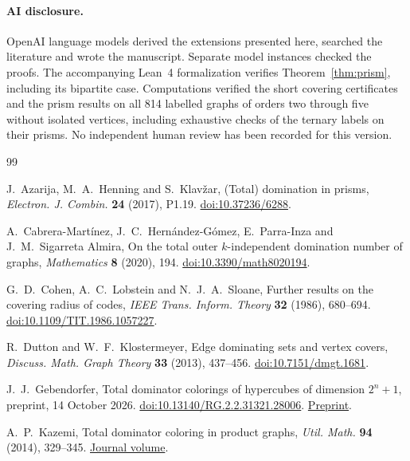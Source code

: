 \documentclass[11pt,a4paper]{article}
\begin{document}
\paragraph{AI disclosure.}
OpenAI language models derived the extensions presented here, searched the
literature and wrote the manuscript. Separate model instances checked
the proofs. The accompanying Lean~4 formalization verifies
Theorem~\ref{thm:prism}, including its bipartite case.
Computations verified the short covering certificates and
the prism results on all 814 labelled graphs of orders two through five
without isolated vertices, including exhaustive checks of the ternary
labels on their prisms. No independent human review has been recorded
for this version.

\begin{thebibliography}{99}
\raggedright

J.~Azarija, M.~A.~Henning and S.~Klav\v{z}ar,
(Total) domination in prisms,
\emph{Electron. J. Combin.} \textbf{24} (2017), P1.19.
\href{https://doi.org/10.37236/6288}{doi:10.37236/6288}.

A.~Cabrera-Mart\'inez, J.~C.~Hern\'andez-G\'omez, E.~Parra-Inza and
J.~M.~Sigarreta Almira, On the total outer $k$-independent domination
number of graphs, \emph{Mathematics} \textbf{8} (2020), 194.
\href{https://doi.org/10.3390/math8020194}{doi:10.3390/math8020194}.

G.~D.~Cohen, A.~C.~Lobstein and N.~J.~A.~Sloane,
Further results on the covering radius of codes,
\emph{IEEE Trans. Inform. Theory} \textbf{32} (1986), 680--694.
\href{https://doi.org/10.1109/TIT.1986.1057227}{doi:10.1109/TIT.1986.1057227}.

R.~Dutton and W.~F.~Klostermeyer, Edge dominating sets and vertex covers,
\emph{Discuss. Math. Graph Theory} \textbf{33} (2013), 437--456.
\href{https://doi.org/10.7151/dmgt.1681}{doi:10.7151/dmgt.1681}.

J.~J.~Gebendorfer, Total dominator colorings of hypercubes of dimension
$2^n+1$, preprint, 14 October 2026.
\href{https://doi.org/10.13140/RG.2.2.31321.28006}{doi:10.13140/RG.2.2.31321.28006}.
\href{https://www.researchgate.net/publication/415823778_Total_dominator_colorings_of_hypercubes_of_dimension_2_n_1}{Preprint}.

A.~P.~Kazemi, Total dominator coloring in product graphs,
\emph{Util. Math.} \textbf{94} (2014), 329--345.
\href{https://combinatorialpress.com/um/vol94/}{Journal volume}.


\end{thebibliography}
\end{document}
